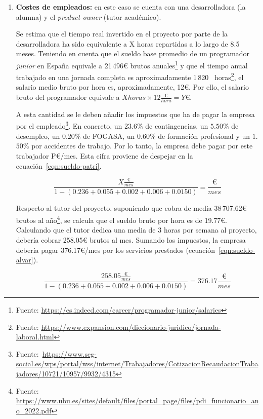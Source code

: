 \begin{enumerate}
	\item\textbf{Costes de empleados:} en este caso se cuenta con una desarrolladora (la alumna) y el \textit{product owner} (tutor académico).

Se estima que el tiempo real invertido en el proyecto por parte de la desarrolladora ha sido equivalente a X horas repartidas a lo largo de 8.5 meses. Teniendo en cuenta que el sueldo base promedio de un programador \textit{junior} en España equivale a 21\,496€ brutos anuales\footnote{Fuente: \url{https://es.indeed.com/career/programador-junior/salaries}} y que el tiempo anual trabajado en una jornada completa es aproximadamente 1\,820 ~horas\footnote{Fuente: \url{ https://www.expansion.com/diccionario-juridico/jornada-laboral.html}}, el salario medio bruto por hora es, aproximadamente, 12€. Por ello, el salario bruto del programador equivale a $X horas \times 12\frac{\text{€}}{hora} = Y \text{€}$.

A esta cantidad se le deben añadir los impuestos que ha de pagar la empresa por el empleado\footnote{Fuente:~\url{https://www.seg-social.es/wps/portal/wss/internet/Trabajadores/CotizacionRecaudacionTrabajadores/10721/10957/9932/4315}}. En concreto, un $23$.$6\%$ de contingencias, un $5$.$50\%$ de desempleo, un $0$.$20\%$ de FOGASA, un $0$.$60\%$ de formación profesional y un $1$.$50\%$ por accidentes de trabajo. Por lo tanto, la empresa debe pagar por este trabajador P€/mes. Esta cifra proviene de despejar en la ecuación~\ref{eqn:sueldo-patri}.

\begin{equation}\label{eqn:sueldo-patri} \frac{X\frac{\text{€}}{mes}}{1 - (0\text{.}236 + 0\text{.}055 + 0\text{.}002 + 0\text{.}006 + 0\text{.}0150)} =  \frac{\text{€}}{mes}\end{equation}


Respecto al tutor del proyecto, suponiendo que cobra de media 38\,707.62€ brutos al año\footnote{Fuente: \url{https://www.ubu.es/sites/default/files/portal_page/files/pdi_funcionario_ano_2022.pdf}}, se calcula que el sueldo bruto por hora es de 19.77€. Calculando que el tutor dedica una media de 3 horas por semana al proyecto, debería cobrar 258.05€ brutos al mes. Sumando los impuestos, la empresa debería pagar 376.17€/mes por los servicios prestados (ecuación~\ref{eqn:sueldo-alvar}).

\begin{equation}\label{eqn:sueldo-alvar} \frac{258\text{.}05 \frac{\text{€}}{mes}}{1 - (0\text{.}236 + 0\text{.}055 + 0\text{.}002 + 0\text{.}006 + 0\text{.}0150)} = 376\text{.}17 \frac{\text{€}}{mes}\end{equation}


\end{enumerate}

